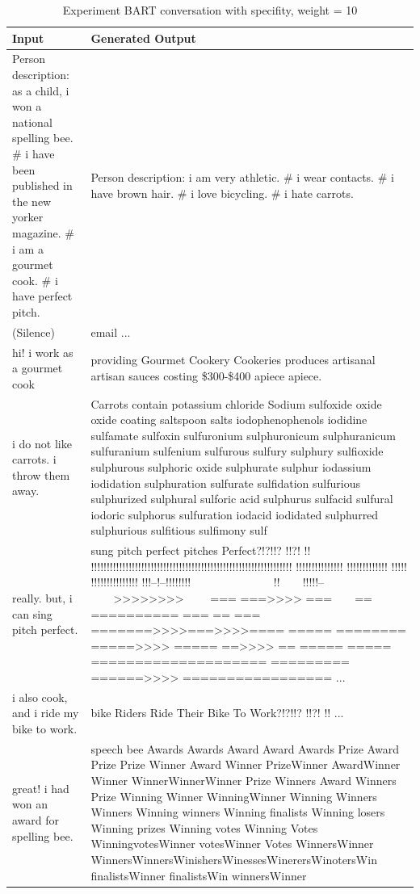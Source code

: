 \begin{table}[ht]
\centering
 \begin{tabular}{|p{7cm}|p{8cm}|} 
 \hline\hline
 \textbf{Input} & \textbf{Generated Output} \\
 \hline\hline
 Person description: as a child, i won a national spelling bee. \# i have been published in the new yorker magazine. \# i am a gourmet cook. \# i have perfect pitch. & Person description: i am very athletic. \# i wear contacts. \# i have brown hair. \# i love bicycling. \# i hate carrots. \\
 \hline
 (Silence) & email ...\\ 
 \hline
 hi! i work as a gourmet cook & providing Gourmet Cookery Cookeries produces artisanal artisan sauces costing \$300-\$400 apiece apiece.\\
 \hline
 i do not like carrots. i throw them away. & Carrots contain potassium chloride Sodium sulfoxide oxide oxide coating saltspoon salts iodophenophenols iodidine sulfamate sulfoxin sulfuronium sulphuronicum sulphuranicum sulfuranium sulfenium sulfurous sulfury sulphury sulfioxide sulphurous sulphoric oxide sulphurate sulphur iodassium iodidation sulphuration sulfurate sulfidation sulfurious sulphurized sulphural sulforic acid sulphurus sulfacid sulfural iodoric sulphorus sulfuration iodacid iodidated sulphurred sulphurious sulfitious sulfimony sulf \\
 \hline 
 really. but, i can sing pitch perfect. & sung pitch perfect pitches Perfect?!?!!? !!?! !! !!!!!!!!!!!!!!!!!!!!!!!!!!!!!!!!!!!!!!!!!!!!!!!!!!!!!!!!!!!!!!!! !!!!!!!!!!!!!!! !!!!!!!!!!!!! !!!!! !!!!!!!!!!!!!!! !!!--!--!!!!!!!!~~~~~~~~~~~~~~ !!~~~~!!!!!--~~~~>>>>>>>>~~~~ === ===>>>> ===~~~~== ========== === == === =======>>>>===>>>>==== ===== ======== =====>>>> ===== ==>>>> == ===== ===== ==================== ========= ======>>>> ================= ...\\
 \hline
 i also cook, and i ride my bike to work. & bike Riders Ride Their Bike To Work?!?!!? !!?! !! ... \\
 \hline 
 great! i had won an award for spelling bee. & speech bee Awards Awards Award Award Awards Prize Award Prize Prize Winner Award Winner PrizeWinner AwardWinner Winner WinnerWinnerWinner Prize Winners Award Winners Prize Winning Winner WinningWinner Winning Winners Winners Winning winners Winning finalists Winning losers Winning prizes Winning votes Winning Votes WinningvotesWinner votesWinner Votes WinnersWinner WinnersWinnersWinishersWinessesWinerersWinotersWin finalistsWinner finalistsWin winnersWinner \\
 \hline\hline
 \end{tabular}
 \caption{Experiment BART conversation with specifity, weight = 10}
\label{tab:bart_conversation_idf5}
\end{table}


